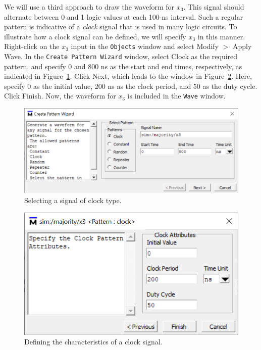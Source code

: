 \documentclass[11pt, twoside, pdftex]{article}
\begin{document}
We will use a third approach to draw the waveform for $x_3$. This signal
should alternate between 0 and 1 logic values at each 100-ns interval.
Such a regular pattern is indicative of a {\it clock} signal that is used in many logic circuits.
To illustrate how a clock signal can be defined, we will specify $x_3$ in this manner.
Right-click on the $x_3$ input in the \texttt{Objects} window 
and select {\sf Modify $>$ Apply Wave}. 
In the \texttt{Create Pattern Wizard} window, select {\sf Clock} 
as the required pattern, and specify 
0 and 800 ns as the start and end times, respectively, as indicated in Figure~\ref{fig:20}.
Click {\sf Next}, which leads to the window in Figure~\ref{fig:21}. Here, specify 0 as the 
initial value, 200 ns as the clock period, and 50 as the duty cycle. Click {\sf Finish}.
Now, the waveform for $x_3$ is included in the \texttt{Wave} window.

\begin{figure}[H]
   \begin{center}
      \includegraphics[scale=1.0]{figures/figure20.png}
   \caption{Selecting a signal of clock type.} 
	 \label{fig:20}
	 \end{center}
\end{figure}

\begin{figure}[H]
   \begin{center}
      \includegraphics[scale=1.0]{figures/figure21.png}
   \caption{Defining the characteristics of a clock signal.} 
	 \label{fig:21}
	 \end{center}
\end{figure}
\end{document}
